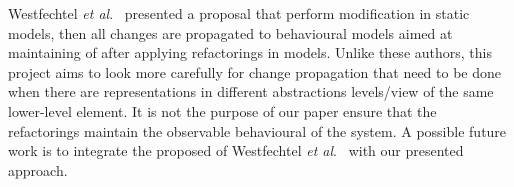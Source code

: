 Westfechtel \textit{et al}.~\cite{ICSOFT2014_Winetzhammer} presented a proposal that perform modification in static models, then all changes are propagated to behavioural models aimed at maintaining of after applying refactorings in models. Unlike these authors, this project aims to look more carefully for change propagation that need to be done when there are representations in different abstractions levels/view of the same lower-level element. It is not the purpose of our paper ensure that the refactorings maintain the observable behavioural of the system. A possible future work is to integrate the proposed of Westfechtel \textit{et al}.~\cite{ICSOFT2014_Winetzhammer} with our presented approach.






